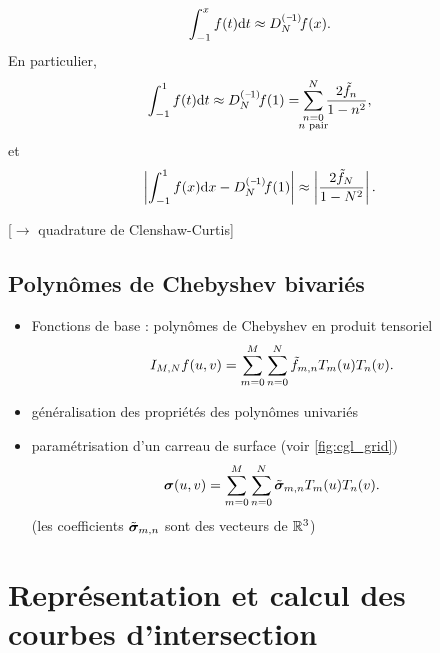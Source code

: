 \begin{equation}
	\int_{-1}^{x} f(t) \dx{t} 
	\approx \interpprim{f}{N}(x).
\end{equation}
En particulier,
\begin{equation}
	\int_{-1}^{1} f(t) \dx{t} 
	\approx 
	\interpprim{f}{N}(1)
	=
	\sum_{\mathclap{\substack{n = 0\\n \text{ pair}}}}^{N} \frac{2 \tilde{f}_n}{1 - n^2},
\end{equation}
et
\begin{equation}
	\left| \int_{-1}^{1} f(x) \dx{x} - \interpprim{f}{N}(1) \right|
	\approx
	\left|\frac{2 \tilde{f}_{N}}{1 - N^2}\right|.
\end{equation}

[$\to$ quadrature de Clenshaw-Curtis]








\subsection{Polynômes de Chebyshev bivariés}
\begin{itemize}
	\item Fonctions de base : polynômes de Chebyshev en produit tensoriel
	\[ \interpolant{f}{M,N}(u,v) = \sum_{m=0}^{M} \sum_{n=0}^{N} \tilde{f}_{m,n} T_m(u) T_n(v). \]
	\item généralisation des propriétés des polynômes univariés
	\item paramétrisation d'un carreau de surface (voir \autoref{fig:cgl_grid})
	\begin{equation}
		\bs(u,v) = \sum_{m=0}^{M} \sum_{n=0}^{N} \tilde{\bs}_{m,n} T_m(u) T_n(v).
	\end{equation}
	(les coefficients $\tilde{\bs}_{m,n}$ sont des vecteurs de $\reals^3$)
\end{itemize}

%

\section{Représentation et calcul des courbes d'intersection}
\label{section:representation_intersections}

